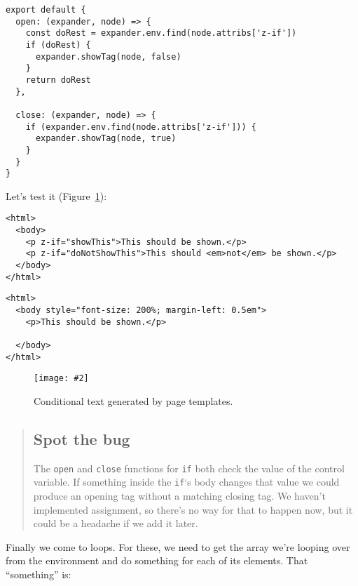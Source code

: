 \documentclass[krantzl]{krantz}
\newcommand{\figpdf}[4]{\begin{figure}%
\centering%
\texttt{[image: \#2]}%
\caption{#3}%
\label{#1}%
\end{figure}}
\newcommand{\figref}[1]{Figure~\ref{#1}}
\begin{document}
\begin{lstlisting}[frame=tblr]
export default {
  open: (expander, node) => {
    const doRest = expander.env.find(node.attribs['z-if'])
    if (doRest) {
      expander.showTag(node, false)
    }
    return doRest
  },

  close: (expander, node) => {
    if (expander.env.find(node.attribs['z-if'])) {
      expander.showTag(node, true)
    }
  }
}
\end{lstlisting}



Let’s test it (\figref{page-templates-output-conditional}):


\begin{lstlisting}[frame=tblr,backgroundcolor=\color{black!5}]
<html>
  <body>
    <p z-if="showThis">This should be shown.</p>
    <p z-if="doNotShowThis">This should <em>not</em> be shown.</p>
  </body>
</html>
\end{lstlisting}



\begin{lstlisting}[frame=tblr,backgroundcolor=\color{black!5}]
<html>
  <body style="font-size: 200%; margin-left: 0.5em">
    <p>This should be shown.</p>

  </body>
</html>
\end{lstlisting}


\figpdf{page-templates-output-conditional}{./page-templates/output-conditional.pdf}{Conditional text generated by page templates.}{0.6}

\begin{quotation}

\subsection*{Spot the bug}


The \texttt{open} and \texttt{close} functions for \texttt{if} both check the value of the control variable.
If something inside the \texttt{if}‘s body changes that value
we could produce an opening tag without a matching closing tag.
We haven’t implemented assignment,
so there’s no way for that to happen now,
but it could be a headache if we add it later.

\end{quotation}


Finally we come to loops.
For these,
we need to get the array we’re looping over from the environment
and do something for each of its elements.
That “something” is:
\end{document}
